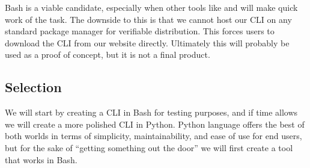 Bash is a viable candidate, especially when other tools like  and  will make quick work of the task.
The downside to this is that we cannot host our CLI on any standard package manager for verifiable distribution.
This forces users to download the CLI from our website directly.
Ultimately this will probably be used as a proof of concept, but it is not a final product.

\subsection{Selection}

We will start by creating a CLI in Bash for testing purposes, and if time allows we will create a more polished CLI in Python.
Python language offers the best of both worlds in terms of simplicity, maintainability, and ease of use for end users, but for the sake of ``getting something out the door'' we will first create a tool that works in Bash.
